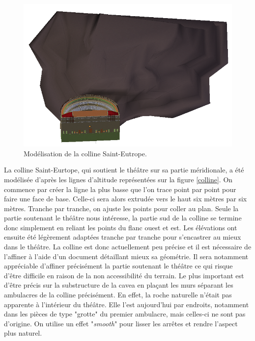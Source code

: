 \begin{figure}[!h]
	\centering
	\includegraphics[width=\textwidth]{images/modColline}
	\caption{Modélisation de la colline Saint-Eutrope.} 
	\label{modColline} 
\end{figure}

La colline Saint-Eurtope, qui soutient le théâtre sur sa partie méridionale, a été modélisée d'après les lignes d'altitude représentées sur la figure \ref{colline}. On commence par créer la ligne la plus basse que l'on trace point par point pour faire une face de base. Celle-ci sera alors extrudée vers le haut six mètres par six mètres. Tranche par tranche, on ajuste les points pour coller au plan. Seule la partie soutenant le théâtre nous intéresse, la partie sud de la colline se termine donc simplement en reliant les points du flanc ouest et est. Les élévations ont ensuite été légèrement adaptées tranche par tranche pour s'encastrer au mieux dans le théâtre. La colline est donc actuellement peu précise et il est nécessaire de l'affiner à l'aide d'un document détaillant mieux sa géométrie. Il sera notamment appréciable d'affiner précisément la partie soutenant le théâtre ce qui risque d'être difficile en raison de la non accessibilité du terrain. Le plus important est d'être précis sur la substructure de la  \gls{cavea} en plaçant les murs séparant les  \glspl{ambulacre} de la colline précisément. En effet, la roche naturelle n'était pas apparente à l'intérieur du théâtre. Elle l'est aujourd'hui par endroits, notamment dans les pièces de type "grotte" du premier \gls{ambulacre}, mais celles-ci ne sont pas d'origine. On utilise un effet "\textit{smooth}" pour lisser les arrêtes et rendre l'aspect plus naturel.


